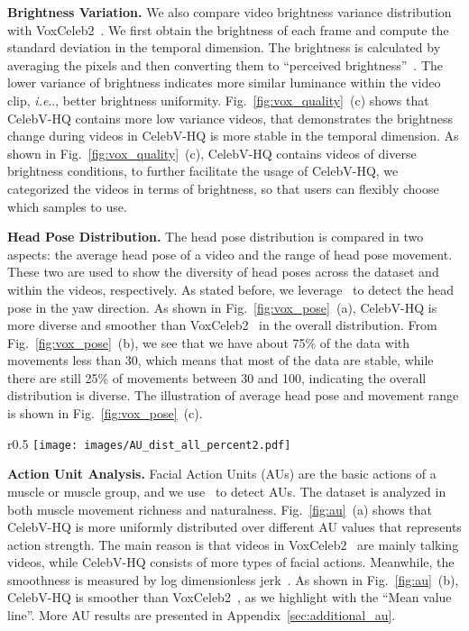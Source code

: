 \documentclass[runningheads]{llncs}
\makeatletter
\DeclareRobustCommand\onedot{\futurelet\@let@token\@onedot}
\def\@onedot{\ifx\@let@token.\else.\null\fi\xspace}
\def\ie{\emph{i.e}\onedot} \def\Ie{\emph{I.e}\onedot}
\makeatother
\begin{document}
\noindent \textbf{Brightness Variation. }
We also compare video brightness variance distribution with VoxCeleb2~\cite{vox2}. We first obtain the brightness of each frame and compute the standard deviation in the temporal dimension. 
The brightness is calculated by averaging the pixels and then converting them to ``perceived brightness''~\cite{bezryadin2007brightness}.
The lower variance of brightness indicates more similar luminance within the video clip, \ie, better brightness uniformity. Fig.~\ref{fig:vox_quality}~(c) shows that CelebV-HQ contains more low variance videos, that demonstrates the brightness change during videos in CelebV-HQ is more stable in the temporal dimension.
As shown in Fig.~\ref{fig:vox_quality}~(c), CelebV-HQ contains videos of diverse brightness conditions, to further facilitate the usage of CelebV-HQ, we categorized the videos in terms of brightness, so that users can flexibly choose which samples to use. 



\noindent \textbf{Head Pose Distribution.}
The head pose distribution is compared in two aspects: the average head pose of a video and the range of head pose movement. These two are used to show the diversity of head poses across the dataset and within the videos, respectively. As stated before, we leverage~\cite{wu2018look} to detect the head pose in the yaw direction. 
As shown in Fig.~\ref{fig:vox_pose}~(a), CelebV-HQ is more diverse and smoother than VoxCeleb2~\cite{vox2} in the overall distribution. From Fig.~\ref{fig:vox_pose}~(b), we see that we have about 75\% of the data with movements less than 30, which means that most of the data are stable, while there are still 25\% of movements between 30 and 100, indicating the overall distribution is diverse. The illustration of average head pose and  movement range is shown in Fig.~\ref{fig:vox_pose}~(c).

\begin{wrapfigure}{r}{0.5\textwidth}
\vspace{-5mm}
\centering
\texttt{[image: images/AU\_dist\_all\_percent2.pdf]}
\caption{\textbf{Distribution and smoothness of action units.} We evaluate the distribution (a) and smoothness (b) of action units.}
\label{fig:au}
\vspace{-5mm}
\end{wrapfigure}

\noindent \textbf{Action Unit Analysis.}
Facial Action Units (AUs) are the basic actions of a muscle or muscle group, and we use~\cite{fan2020fau} to detect AUs. 
The dataset is analyzed in both muscle movement richness and naturalness.
Fig.~\ref{fig:au}~(a) shows that CelebV-HQ is more uniformly distributed over different AU values that represents action strength. The main reason is that videos in VoxCeleb2~\cite{vox2} are mainly talking videos, while CelebV-HQ consists of more types of facial actions. Meanwhile, the smoothness is measured by log dimensionless jerk~\cite{ldljerk}. As shown in Fig.~\ref{fig:au}~(b), CelebV-HQ is smoother than VoxCeleb2~\cite{vox2}, as we highlight with the ``Mean value line''. More AU results are presented in Appendix~\ref{sec:additional_au}.
\end{document}
